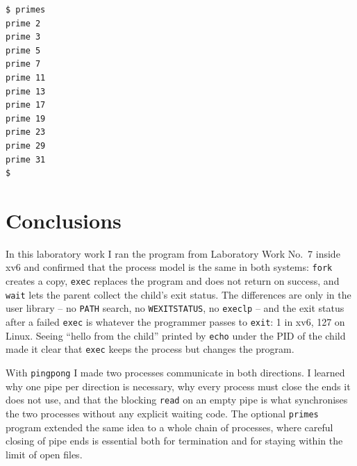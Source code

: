 \documentclass[12pt,a4paper]{article}
\begin{document}
\begin{lstlisting}[style=terminal,caption={Running primes}]
$ primes
prime 2
prime 3
prime 5
prime 7
prime 11
prime 13
prime 17
prime 19
prime 23
prime 29
prime 31
$
\end{lstlisting}

\newpage
\section*{Conclusions}

In this laboratory work I ran the program from Laboratory Work No.~7 inside xv6 and confirmed that the process model is the same in both systems: \texttt{fork} creates a copy, \texttt{exec} replaces the program and does not return on success, and \texttt{wait} lets the parent collect the child's exit status. The differences are only in the user library -- no \texttt{PATH} search, no \texttt{WEXITSTATUS}, no \texttt{execlp} -- and the exit status after a failed \texttt{exec} is whatever the programmer passes to \texttt{exit}: 1 in xv6, 127 on Linux. Seeing ``hello from the child'' printed by \texttt{echo} under the PID of the child made it clear that \texttt{exec} keeps the process but changes the program.

With \texttt{pingpong} I made two processes communicate in both directions. I learned why one pipe per direction is necessary, why every process must close the ends it does not use, and that the blocking \texttt{read} on an empty pipe is what synchronises the two processes without any explicit waiting code. The optional \texttt{primes} program extended the same idea to a whole chain of processes, where careful closing of pipe ends is essential both for termination and for staying within the limit of open files.
\end{document}
